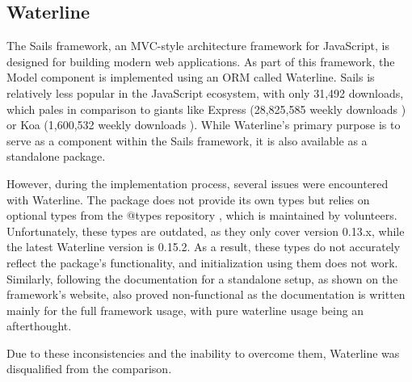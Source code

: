 \subsection{Waterline}

The Sails framework, an MVC-style architecture framework for JavaScript, is
designed for building modern web applications. As part of this framework, the
Model component is implemented using an ORM called Waterline. Sails is
relatively less popular in the JavaScript ecosystem, with only 31,492 downloads,
which pales in comparison to giants like Express (28,825,585 weekly downloads
\cite{express_2022}) or Koa (1,600,532 weekly downloads \cite{koa_2023}). While Waterline's
primary purpose is to serve as a component within the Sails framework, it is
also available as a standalone package.

However, during the implementation process, several issues were encountered with
Waterline. The package does not provide its own types but relies on optional
types from the @types repository \cite{definitelytyped/types/waterline}, which
is maintained by volunteers. Unfortunately, these types are outdated, as they
only cover version 0.13.x, while the latest Waterline version is 0.15.2. As a
result, these types do not accurately reflect the package's functionality, and
initialization using them does not work. Similarly, following the documentation
for a standalone setup, as shown on the framework's website, also proved
non-functional as the documentation \cite{waterline-docs} is written mainly for the full framework
usage, with pure waterline usage being an afterthought.

Due to these inconsistencies and the inability to overcome them, Waterline was
disqualified from the comparison.